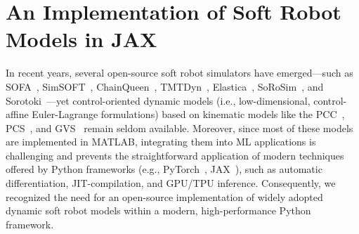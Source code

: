 \section{An Implementation of Soft Robot Models in JAX}\label{sec:apx:infrastructure:jsrm}
In recent years, several open-source soft robot simulators have emerged—such as SOFA~\citep{coevoet2017software}, SimSOFT~\citep{grazioso2019geometrically}, ChainQueen~\citep{hu2019chainqueen}, TMTDyn~\citep{sadati2021tmtdyn}, Elastica~\citep{naughton2021elastica}, SoRoSim~\citep{mathew2022sorosim}, and Sorotoki~\citep{caasenbrood2024sorotoki}—yet control-oriented dynamic models (i.e., low-dimensional, control-affine Euler-Lagrange formulations) based on kinematic models like the \gls{PCC}~\citep{webster2010design}, \gls{PCS}~\citep{renda2018discrete}, and \gls{GVS}~\citep{boyer2020dynamics, renda2020geometric} remain seldom available. Moreover, since most of these models are implemented in MATLAB, integrating them into \gls{ML} applications is challenging and prevents the straightforward application of modern techniques offered by Python frameworks (e.g., PyTorch~\citep{pytorch}, JAX~\citep{jax2018github}), such as automatic differentiation, \gls{JIT}-compilation, and \gls{GPU}/\gls{TPU} inference.
Consequently, we recognized the need for an open-source implementation of widely adopted dynamic soft robot models within a modern, high-performance Python framework.

